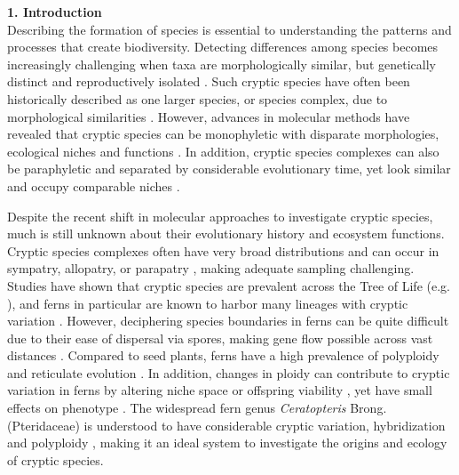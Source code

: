 \documentclass[12pt]{article}
\begin{document}
\begin{flushleft}
{\large\textbf{1. Introduction}}\\

Describing the formation of species is essential to understanding the patterns and processes that create biodiversity. Detecting differences among species becomes increasingly challenging when taxa are morphologically similar, but genetically distinct and reproductively isolated \autocite{Bickford2007, Masuyama1992, Paris1989}. Such cryptic species have often been historically described as one larger species, or species complex, due to morphological similarities \autocite{Paris1989}. However, advances in molecular methods have revealed that cryptic species can be monophyletic with disparate morphologies, ecological niches and functions \autocite{Amato2007, Hebert2004, Sattler2007, Southgate2019}. In addition, cryptic species complexes can also be paraphyletic and separated by considerable evolutionary time, yet look similar and occupy comparable niches \autocite{Amor2014, Cunnington2005}. 

Despite the recent shift in molecular approaches to investigate cryptic species, much is still unknown about their evolutionary history and ecosystem functions. Cryptic species complexes often have very broad distributions \autocite{Der2009, Knowlton1993, Nygren2014} and can occur in sympatry, allopatry, or parapatry \autocite{Bickford2007}, making adequate sampling challenging. Studies have shown that cryptic species are prevalent across the Tree of Life (e.g. \cite{Bickford2007, Del_Carmen_Molina2011, Hebert2004, Nygren2014}), and ferns in particular are known to harbor many lineages with cryptic variation \autocite{Adjie2007, Paris1989, Yatabe2009}. However, deciphering species boundaries in ferns can be quite difficult due to their ease of dispersal via spores, making gene flow possible across vast distances \autocite{Barrington1993, Tryon1970}. Compared to seed plants, ferns have a high prevalence of polyploidy and reticulate evolution \autocite{Barrington1989, Paris1989, Sigel2016, Otto2000, Otto2000}. In addition, changes in ploidy can contribute to cryptic variation in ferns by altering niche space or offspring viability \autocite{Otto2007, Southgate2019, Masuyama2002}, yet have small effects on phenotype \autocite{Patel2019}. The widespread fern genus \textit{Ceratopteris} Brong. (Pteridaceae) is understood to have considerable cryptic variation, hybridization and polyploidy \autocite{Adjie2007, LloydTax1974, Masuyama2010}, making it an ideal system to investigate the origins and ecology of cryptic species.


\end{flushleft}
\end{document}
